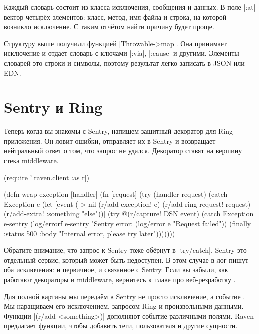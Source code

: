 Каждый словарь состоит из класса исключения, сообщения и данных. В поле
\spverb|:at| вектор четыр\"{е}х элементов: класс, метод, имя файла и строка, на
которой возникло исключение. С таким отч\"{е}том найти причину будет проще.


Структуру выше получили функцией \spverb|Throwable->map|. Она принимает
исключение и отдает словарь с ключами \spverb|:via|, \spverb|:cause| и
другими. Элементы словарей это строки и символы, поэтому результат легко
записать в JSON или EDN.

\section{Sentry и Ring}


Теперь когда вы знакомы с Sentry, напишем защитный декоратор для
Ring-приложения. Он ловит ошибки, отправляет их в Sentry и возвращает
нейтральный ответ о том, что запрос не удался. Декоратор ставят на вершину стека
middleware.

\begin{english}
  \begin{clojure/lines}
(require '[raven.client :as r])

(defn wrap-exception
  [handler]
  (fn [request]
    (try
      (handler request)
      (catch Exception e
        (let [event (-> nil
                        (r/add-exception! e)
                        (r/add-ring-request! request)
                        (r/add-extra! {:something "else"}))]
          (try
            @(r/capture! DSN event)
            (catch Exception e-sentry
              (log/errorf e-sentry "Sentry error: %
              (log/error e "Request failed"))
            (finally
              {:status 500
               :body "Internal error, please try later"})))))))
  \end{clojure/lines}
\end{english}

Обратите внимание, что запрос к Sentry тоже об\"{е}рнут в \spverb|try/catch|. Sentry
это отдельный сервис, который может быть недоступен. В этом случае в лог пишут
оба исключения: и первичное, и связанное с Sentry. Если вы забыли, как работают
декораторы и middleware, вернитесь к~главе про веб-резработку .


Для полной картины мы переда\"{е}м в Sentry не просто исключение, а событие
. Мы наращиваем его исключением, запросом Ring и произвольными
данными. Функции \spverb|(r/add-<something>)| дополняют событие различными
полями. Raven предлагает функции, чтобы добавить теги, пользователя и другие
сущности.

